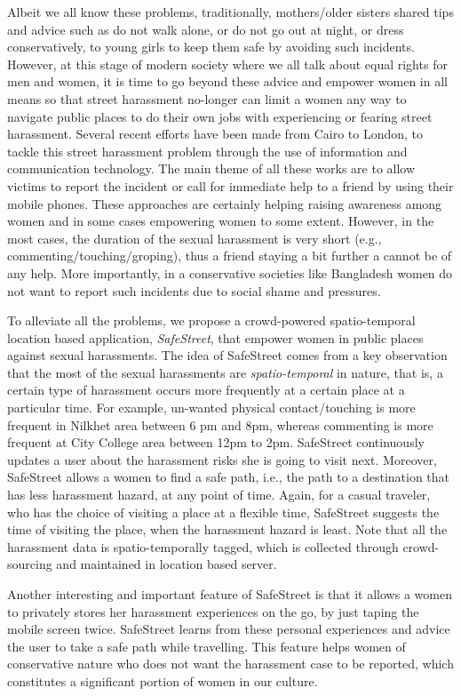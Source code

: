 \documentclass{sig-alternate}
\begin{document}
Albeit we all know these problems, traditionally, mothers/older sisters shared tips and advice such as do not walk alone, or do not go out at night, or dress conservatively, to young girls to keep them safe by avoiding such incidents. However, at this stage of modern society where we all talk about equal rights for men and women, it is time to go beyond these advice and empower women in all means so that street harassment no-longer can limit a women any way to navigate public places to do their own jobs with experiencing or fearing street harassment. Several recent efforts have been made from Cairo to London, to tackle this street harassment problem through the use of information and communication technology. The main theme of all these works are to allow victims to report the incident or call for immediate help to a friend by using their mobile phones. These approaches are certainly helping raising awareness among women and in some cases empowering women to some extent. However, in the most cases, the duration of the sexual harassment is very short (e.g., commenting/touching/groping), thus a friend staying a bit further a cannot be of any help. More importantly, in a conservative societies like Bangladesh women do not want to report such incidents due to social shame and pressures.

To alleviate all the problems, we propose a crowd-powered spatio-temporal location based application, \emph{SafeStreet}, that empower women in public places against sexual harassments. The idea of SafeStreet comes from a key observation that the most of the sexual harassments are \emph{spatio-temporal} in nature, that is, a certain type of harassment occurs more frequently at a certain place at a particular time. For example, un-wanted physical contact/touching is more frequent in Nilkhet area between 6 pm  and 8pm, whereas commenting is more frequent at City College area between 12pm to 2pm. SafeStreet continuously updates a user about the harassment risks she is going to visit next. Moreover, SafeStreet allows a women to find a safe path, i.e., the path to a destination that has less harassment hazard, at any point of time. Again, for a casual traveler, who has the choice of visiting a place at a flexible time, SafeStreet suggests the time of visiting the place, when the harassment hazard is least. Note that all the harassment data is spatio-temporally tagged, which is collected through crowd-sourcing and maintained in location based server.

Another interesting and important feature of SafeStreet is that it allows a women to privately stores her harassment experiences on the go, by just taping the mobile screen twice. SafeStreet learns from these personal experiences and advice the user to take a safe path while travelling. This feature helps women of conservative nature who does not want the harassment case to be reported, which constitutes a significant portion of women in our culture.
\end{document}
